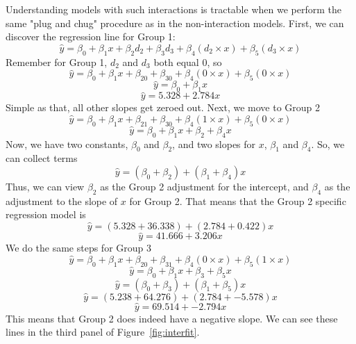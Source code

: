 Understanding models with such interactions is tractable when we perform the same "plug and chug" procedure as in the non-interaction models. First, we can discover the regression line for Group 1:
\[
\hat{y}=\beta_0+\beta_1x+\beta_2d_{2}+\beta_3d_{3}+\beta_4\left(d_{2}\times x\right)+\beta_5\left(d_{3} \times x\right)
\]
Remember for Group 1, $d_2$ and $d_3$ both equal 0, so
\[
\hat{y}=\beta_0+\beta_1x+\beta_20+\beta_30+\beta_4\left(0\times x\right)+\beta_5\left(0 \times x\right)
\]
\[
\hat{y}=\beta_0+\beta_1x
\]
\[
\hat{y}=5.328+2.784x
\]
Simple as that, all other slopes get zeroed out. Next, we move to Group 2
\[
\hat{y}=\beta_0+\beta_1x+\beta_21+\beta_30+\beta_4\left(1\times x\right)+\beta_5\left(0 \times x\right)
\]
\[
\hat{y}=\beta_0+\beta_1x+\beta_2+\beta_4x
\]
Now, we have two constants, $\beta_0$ and $\beta_2$, and two slopes for $x$, $\beta_1$ and $\beta_4$. So, we can collect terms
\[
\hat{y}=\left(\beta_0+\beta_2\right)+\left(\beta_1+\beta_4\right)x
\]
Thus, we can view $\beta_2$ as the Group 2 adjustment for the intercept, and $\beta_4$ as the adjustment to the slope of $x$ for Group 2. That means that the Group 2 specific regression model is
\[
\hat{y}=\left(5.328+36.338\right)+\left(2.784+0.422\right)x
\]
\[
\hat{y}=41.666+3.206x
\]
We do the same steps for Group 3
\[
\hat{y}=\beta_0+\beta_1x+\beta_20+\beta_31+\beta_4\left(0\times x\right)+\beta_5\left(1 \times x\right)
\]
\[
\hat{y}=\beta_0+\beta_1x+\beta_3+\beta_5x
\]
\[
\hat{y}=\left(\beta_0+\beta_3\right)+\left(\beta_1+\beta_5\right)x
\]
\[
\hat{y}=\left(5.238+64.276\right)+\left(2.784+-5.578\right)x
\]
\[
\hat{y}=69.514+-2.794x
\]
This means that Group 2 does indeed have a negative slope. We can see these lines in the third panel of Figure~\ref{fig:interfit}.
